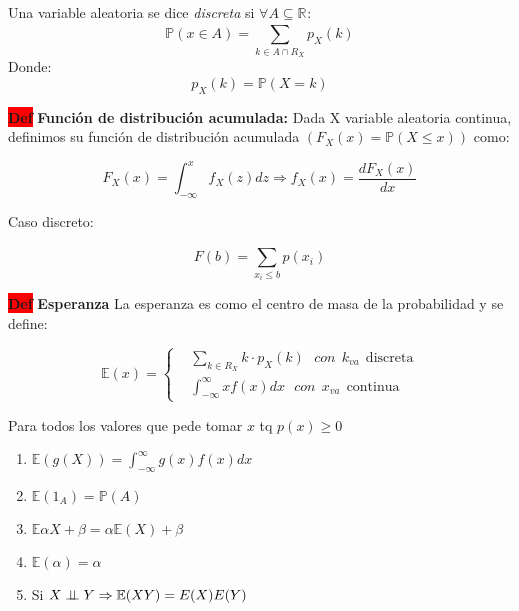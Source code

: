\documentclass[letterpaper,10.5pt,twocolumn]{article} %
\newcommand{\R}[1][]{\mathbb{R}^{#1}}
\newcommand{\E}{\mathbb{E} }
\newcommand{\Proba}{\mathbb{P} }
\newcommand{\hlc}[2][yellow]{ \colorbox{#1}{#2} }
\newcommand{\Def}{\hlc[red]{\bfseries Def}}
\newcommand{\independent}{\perp\mkern-9.5mu\perp}
\let\oldfrac=\frac
\renewcommand{\frac}[2]{\ensuremath{\oldfrac{#1}{#2}}}
\begin{document}
Una variable aleatoria se dice \textit{discreta} si $\forall A \subseteq \R$:
\begin{equation*}
    \Proba (x \in A) = \sum_{k \in A\cap R_X }^{} p_X(k)
\end{equation*}
Donde:
\begin{equation*}
    p_X(k) = \Proba (X=k)
\end{equation*}


\Def \textbf{Función de distribución acumulada:}
Dada X variable aleatoria continua, definimos su función de distribución acumulada $(F_X (x) = \Proba (X \leq x))$ como:

\begin{equation*}
    F_{X}(x) = \int_{-\infty}^{x} f_{X} (z) dz \Rightarrow f_X (x) = \frac{dF_X (x)}{dx}
\end{equation*}

Caso discreto: 

\begin{equation*}
    F(b) = \sum_{x_i \leq b}^{} p(x_i)
\end{equation*}

\Def \textbf{Esperanza} La esperanza es como el centro de masa
de la probabilidad y se define:

\begin{equation*}
\E(x)= \left\{
\begin{aligned}
    &\sum_{k\in R_X}^{} k \cdot p_X (k)\ \ \ con\ \ k_{va}\ \ \textrm{discreta}\\
    &\int_{-\infty}^{\infty} x f(x) dx\ \ \ con\ \ x_{va}\ \ \textrm{continua}
\end{aligned}
\right.    
\end{equation*}

Para todos los valores que pede tomar $x$ tq $p(x)\geq 0$

\begin{enumerate}[label={(\textit{\arabic*})}, leftmargin=*, itemsep=0pt]
    \item $\E(g(X))=\int_{-\infty}^{\infty}g(x)f(x)dx $
    \item $\E(1_A)=\Proba (A) $
    \item $\E\alpha X + \beta = \alpha \E(X) + \beta $
    \item $\E(\alpha) = \alpha $
    \item Si $X \independent Y \Rightarrow \E(XY) = E(X)E(Y)$
\end{enumerate}
\end{document}
